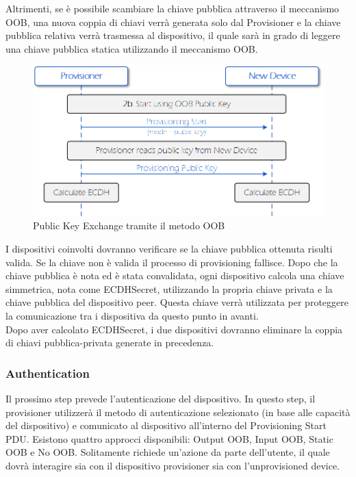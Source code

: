 \noindent Altrimenti, se è possibile scambiare la chiave pubblica attraverso il meccanismo OOB, una nuova coppia di chiavi verrà generata solo dal Provisioner e la chiave pubblica relativa verrà trasmessa al dispositivo, il quale sarà in grado di leggere una chiave pubblica statica utilizzando il meccanismo OOB.\\

\begin{figure}[!ht]
    \centering
    \includegraphics[width = \textwidth]{images/Provisioning_public_key_exchange_b.png}
    \caption{Public Key Exchange tramite il metodo OOB}
    \label{fig:provisioning_public_key_b}
\end{figure}

\noindent I dispositivi coinvolti dovranno verificare se la chiave pubblica ottenuta risulti valida. Se la chiave non è valida il processo di provisioning fallisce. Dopo che la chiave pubblica è nota ed è stata convalidata, ogni dispositivo calcola una chiave simmetrica, nota come ECDHSecret, utilizzando la propria chiave privata e la chiave pubblica del dispositivo peer. Questa chiave verrà utilizzata per proteggere la comunicazione tra i dispositiva da questo punto in avanti.\\
Dopo aver calcolato ECDHSecret, i due dispositivi dovranno eliminare la coppia di chiavi pubblica-privata generate in precedenza.

\subsubsection{Authentication}
Il prossimo step prevede l'autenticazione del dispositivo. In questo step, il provisioner utilizzerà il metodo di autenticazione selezionato (in base alle capacità del dispositivo) e comunicato al dispositivo all'interno del Provisioning Start PDU. Esistono quattro approcci disponibili: Output OOB, Input OOB, Static OOB e No OOB. Solitamente richiede un'azione da parte dell'utente, il quale dovrà interagire sia con il dispositivo provisioner sia con l'unprovisioned device.

